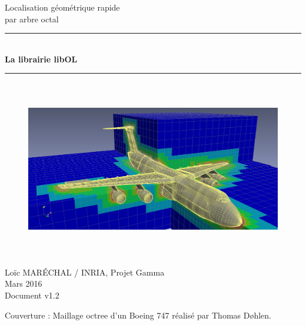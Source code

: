 \documentclass[a4paper,12pt]{article}
\newcommand{\HRule}{\rule{\linewidth}{1mm}}
\begin{document}
%
%

\begin{titlepage}

\begin{center}
\huge Localisation géométrique rapide \\ par arbre octal
\HRule \\
\medskip
{\Huge \bfseries La librairie libOL} \\
\HRule
\end{center}


\begin{figure}[htbp]
\begin{center}
\includegraphics[height=7.8cm]{octree_mesh.png}
\end{center}
\end{figure}


\begin{flushright}
\Large Lo\"ic MAR\'ECHAL / INRIA, Projet Gamma\\
\Large Mars 2016 \\
\normalsize Document v1.2
\end{flushright}

\end{titlepage}

\clearpage

\setcounter{tocdepth}{2}
\tableofcontents
\vfill

\footnotesize{Couverture : Maillage octree d'un Boeing 747 réalisé par Thomas Døhlen.}
\normalsize

\clearpage


%
%
\end{document}
